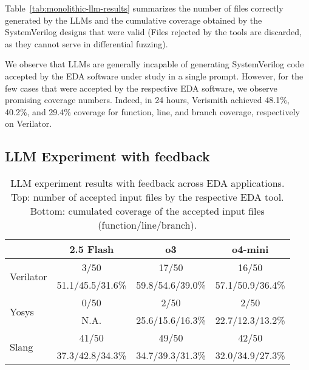 Table~\ref{tab:monolithic-llm-results} summarizes the number of files correctly generated by the LLMs and the cumulative coverage obtained by the SystemVerilog designs that were valid (Files rejected by the tools are discarded, as they cannot serve in differential fuzzing).

We observe that LLMs are generally incapable of generating SystemVerilog code accepted by the EDA software under study in a single prompt.
However, for the few cases that were accepted by the respective EDA software, we observe promising coverage numbers.
Indeed, in 24 hours, Verismith achieved 48.1\%, 40.2\%, and 29.4\% coverage for function, line, and branch coverage, respectively on Verilator.

\subsection{LLM Experiment with feedback}
\label{sec:llms:feedback-llm}

\begin{table}[t]
    \centering
    \caption{LLM experiment results with feedback across EDA applications. Top: number of accepted input files by the respective EDA tool. Bottom: cumulated coverage of the accepted input files (function/line/branch).}
    \label{tab:feedback-llm-results}
    \small
    \begin{tabular}{|l|c|c|c|}
        \hline
        \rowcolor{gray!10} %
        \textbf{} & \textbf{2.5 Flash} & \textbf{o3}      & \textbf{o4-mini} \\
        \hline
        \multirow{2}{*}{Verilator}
                  & 3/50               & 17/50            & 16/50            \\
                  & 51.1/45.5/31.6\%   & 59.8/54.6/39.0\% & 57.1/50.9/36.4\% \\
        \hline
        \multirow{2}{*}{Yosys}
                  & 0/50               & 2/50             & 2/50             \\
                  & N.A.            & 25.6/15.6/16.3\% & 22.7/12.3/13.2\% \\
        \hline
        \multirow{2}{*}{Slang}
                  & 41/50              & 49/50            & 42/50            \\
                  & 37.3/42.8/34.3\%   & 34.7/39.3/31.3\% & 32.0/34.9/27.3\% \\
        \hline
    \end{tabular}
\end{table}

